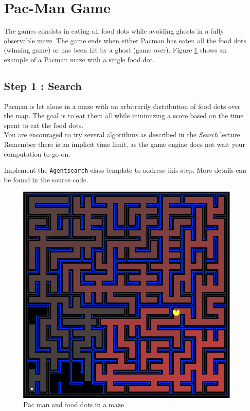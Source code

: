 \documentclass[12pt,a4paper,BCOR12mm, headexclude, footexclude, twoside, openright]{scrartcl}
\numberwithin{equation}{section} %
\numberwithin{figure}{section} %
\numberwithin{table}{section} %
\begin{document}
\section{Pac-Man Game}

The games consists in eating all food dots while avoiding ghosts in a fully observable maze. The game ends when either Pacman has eaten all the food dots (winning game) or has been hit by a ghost (game over). Figure \ref{fullmaze} shows an example of a Pacman maze with a single food dot.

\subsection{Step 1 : Search}

Pacman is let alone in a maze with an arbitrarily distribution of food dots over the map. The goal is to eat them all while minimizing a score based on the time spent to eat the food dots.\\

You are encouraged to try several algorithms as described in the \emph{Search} lecture. Remember there is an implicit time limit, as the game engine does not wait your computation to go on.

Implement the \texttt{Agentsearch} class template to address this step. More details can be found in the source code.

\begin{figure}
	\label{fullmaze}
	\begin{center}

	\includegraphics[scale=0.5]{pacmazefull.png}
    \caption{Pac man and food dots in a maze}
    \end{center}
\end{figure}
\end{document}
